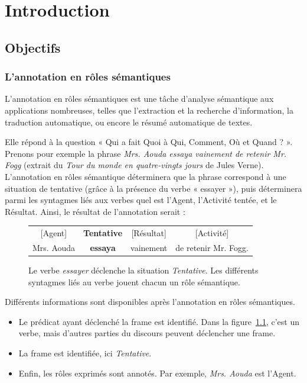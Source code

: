 \chapter{Introduction}
\label{ch:intro}

\section{Objectifs}

\subsection{L'annotation en rôles sémantiques}

L'annotation en rôles sémantiques est une tâche d'analyse sémantique aux
applications nombreuses, telles que l'extraction et la recherche d'information,
la traduction automatique, ou encore le résumé automatique de textes.

Elle répond à la question « Qui a fait Quoi à Qui, Comment, Où et Quand ? ».
Prenons pour exemple la phrase \emph{Mrs. Aouda essaya vainement de retenir Mr.
Fogg} (extrait du \emph{Tour du monde en quatre-vingts jours} de Jules Verne).
L'annotation en rôles sémantique déterminera que la phrase correspond à une
situation de tentative (grâce à la présence du verbe « essayer »), puis
déterminera parmi les syntagmes liés aux verbes quel est l'Agent, l'Activité
tentée, et le Résultat. Ainsi, le résultat de l'annotation serait :

\begin{figure}[ht]
    \centering
    \begin{tabular}{cccc}
    [Agent]  & \textbf{Tentative} & [Résultat]  & [Activité]         \tabularnewline
    Mrs. Aouda & \textbf{essaya}  & vainement & de retenir Mr. Fogg. \tabularnewline
    \end{tabular}
    \caption{\label{fig:introsrl}Le verbe \emph{essayer} déclenche la situation \emph{Tentative}.
    Les différents syntagmes liés au verbe jouent chacun un rôle sémantique.}
\end{figure}

Différents informations sont disponibles après l'annotation en rôles sémantiques.

\begin{itemize}
    \item Le prédicat ayant déclenché la frame est identifié. Dans la
        figure~\ref{fig:introsrl}, c'est un verbe, mais d'autres parties du
        discours peuvent déclencher une frame.
    \item La frame est identifiée, ici \emph{Tentative}.
    \item Enfin, les rôles exprimés sont annotés. Par exemple, \emph{Mrs.
        Aouda} est l'Agent.
\end{itemize}

